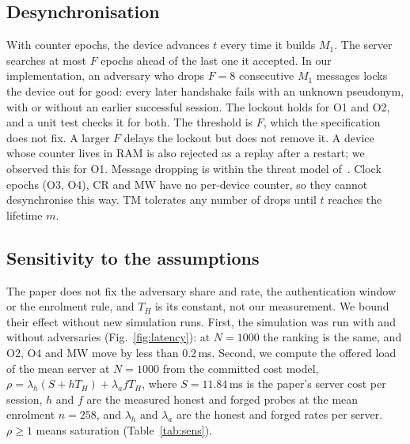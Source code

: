 \subsection{Desynchronisation}
With counter epochs, the device advances $t$ every time it builds $M_1$. The server searches at most $F$ epochs ahead of
the last one it accepted. In our implementation, an adversary who drops $F=8$ consecutive $M_1$ messages locks the device
out for good: every later handshake fails with an unknown pseudonym, with or without an earlier successful session. The
lockout holds for O1 and O2, and a unit test checks it for both. The threshold is $F$, which the specification does not
fix. A larger $F$ delays the lockout but does not remove it. A device whose counter lives in RAM is also rejected as
a replay after a restart; we observed this for O1. Message dropping is within the threat model of~\cite{base}. Clock epochs (O3, O4), CR and MW have no
per-device counter, so they cannot desynchronise this way. TM tolerates any number of drops until $t$ reaches the
lifetime $m$.

\subsection{Sensitivity to the assumptions}\label{sec:sens}
The paper does not fix the adversary share and rate, the authentication window or the enrolment rule, and $T_H$ is its
constant, not our measurement. We bound their effect without new simulation runs. First, the simulation was run with and
without adversaries (Fig.~\ref{fig:latency}): at $N=1000$ the ranking is the same, and O2, O4 and MW move by less than
0.2\,ms. Second, we compute the offered load of the mean server at $N=1000$ from the committed cost model,
$\rho=\lambda_h(S+hT_H)+\lambda_a fT_H$, where $S=11.84$\,ms is the paper's server cost per session, $h$ and $f$ are the
measured honest and forged probes at the mean enrolment $n=258$, and $\lambda_h$ and $\lambda_a$ are the honest and forged
rates per server. $\rho\ge1$ means saturation (Table~\ref{tab:sens}).

